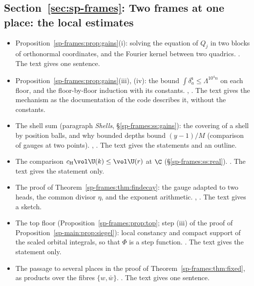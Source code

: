 \subsection*{Section~\ref{sec:sp-frames}: Two frames at one place: the local estimates}
\begin{itemize}[leftmargin=2em,itemsep=1pt]
\item Proposition~\ref{sp-frames:prop:gains}(i): solving the equation of $Q_j$ in two blocks of
  orthonormal coordinates, and the Fourier kernel between two quadrics.
  . The text gives one sentence.
\item Proposition~\ref{sp-frames:prop:gains}(iii), (iv): the bound $\int\delta_a^{\mathsf
  s}\le\Lambda^{10^4n}$ on each floor, and the floor-by-floor induction with its constants.
  ,
  . The text gives the mechanism as the
  documentation of the code describes it, without the constants.
\item The shell sum (paragraph \emph{Shells}, \S\ref{sp-frames:ss:gains}): the covering of a shell by
  position balls, and why bounded depths bound $(y-1)/M$ (comparison of gauges at two points).
  ,
  . The text gives the statements and an outline.
\item The comparison $c_{\mathrm H}\vol\U(k)\le\vol\U(r)$ at $\C$ (\S\ref{sp-frames:ss:real}).
  . The text gives the
  statement only.
\item The proof of Theorem~\ref{sp-frames:thm:findecay}: the gauge adapted to two heads, the common
  divisor $\eta$, and the exponent arithmetic. ,
  . The text gives a sketch.
\item The top floor (Proposition~\ref{sp-frames:prop:top}; step (iii) of the proof of
  Proposition~\ref{sp-main:prop:siegel}): local constancy and compact support of the scaled orbital
  integrals, so that $\Phi$ is a step function. . The
  text gives the statement only.
\item The passage to several places in the proof of Theorem~\ref{sp-frames:thm:fixed}, as products
  over the fibres $\{w,\bar w\}$. . The text
  gives one sentence.
\end{itemize}

